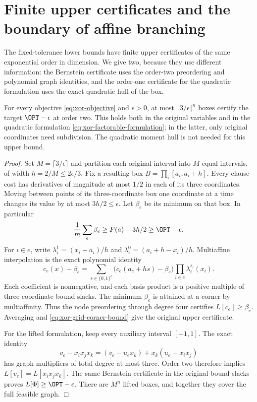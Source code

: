 \section{Finite upper certificates and the boundary of affine branching}
\label{sec:xor-upper-affine}
The fixed-tolerance lower bounds have finite upper certificates of the
same exponential order in dimension. We give two, because they use
different information: the Bernstein certificate uses the order-two
preordering and polynomial graph identities, and the order-one
certificate for the quadratic formulation uses the exact quadratic hull
of the box.

\begin{proposition}
\label{prop:xor-bernstein-upper}
For every objective \eqref{eq:xor-objective} and $\epsilon>0$, at most
$\lceil3/\epsilon\rceil^n$ boxes certify the target $\OPT-\epsilon$
at order two. This holds both in the original variables and in the
quadratic formulation \eqref{eq:xor-factorable-formulation}; in the latter,
only original coordinates need subdivision. The quadratic moment hull
is not needed for this upper bound.
\end{proposition}
\begin{proof}
Set $M=\lceil3/\epsilon\rceil$ and partition each original interval
into $M$ equal intervals, of width $h=2/M\le2\epsilon/3$. Fix a resulting
box $B=\prod_i[a_i,a_i+h]$. Every clause cost has derivatives of
magnitude at most $1/2$ in each of its three coordinates. Moving between
points of its three-coordinate box one coordinate at a time changes its
value by at most $3h/2\le\epsilon$. Let $\beta_e$ be its minimum on
that box. In particular
\begin{equation}\label{eq:xor-grid-corner-bound}
 \frac1m\sum_e\beta_e\ge F(a)-3h/2\ge\OPT-\epsilon.
\end{equation}
For $i\in e$, write $\lambda_i^1=(x_i-a_i)/h$ and
$\lambda_i^0=(a_i+h-x_i)/h$. Multiaffine interpolation is the exact
polynomial identity
\begin{equation}\label{eq:xor-bernstein-identity}
 c_e(x)-\beta_e=
 \sum_{s\in\{0,1\}^e}\bigl(c_e(a_e+hs)-\beta_e\bigr)
       \prod_{i\in e}\lambda_i^{s_i}(x_i).
\end{equation}
Each coefficient is nonnegative, and each basis product is a positive
multiple of three coordinate-bound slacks. The minimum $\beta_e$ is
attained at a corner by multiaffinity. Thus the node preordering through
degree four certifies $L[c_e]\ge\beta_e$. Averaging and
\eqref{eq:xor-grid-corner-bound} give the original upper certificate.

For the lifted formulation, keep every auxiliary interval $[-1,1]$.
The exact identity
\begin{equation}\label{eq:bernstein-graph-transfer}
 v_e-x_ix_jx_k=(v_e-u_ex_k)+x_k(u_e-x_ix_j)
\end{equation}
has graph multipliers of total degree at most three. Order two therefore
implies $L[v_e]=L[x_ix_jx_k]$. The same Bernstein certificate in the
original bound slacks proves $L[\Phi]\ge\OPT-\epsilon$. There are
$M^n$ lifted boxes, and together they cover the full feasible graph.
\end{proof}

